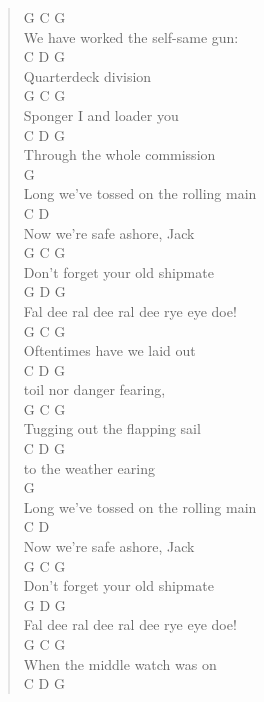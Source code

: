 \documentclass[11pt]{article}
\begin{document}
\begin{verse}
\vspace*{1em}
G                   C        G\\
We have worked the self-same gun:\\
C       D      G\\
Quarterdeck division\\
G              C      G\\
Sponger I and loader you\\
C            D        G\\
Through the whole commission\\
G\\
Long we've tossed on the rolling main\\
C                D\\
Now we're safe ashore, Jack\\
G                  C      G\\
Don't forget your old shipmate\\
G                        D       G\\
Fal dee ral dee ral dee rye eye doe!\\
\vspace*{1em}
\vspace*{1em}
G                C      G\\
Oftentimes have we laid out\\
C         D      G\\
toil nor danger fearing,\\
G                 C       G\\
Tugging out the flapping sail\\
C        D      G\\
to the weather earing\\
G\\
Long we've tossed on the rolling main\\
C                D\\
Now we're safe ashore, Jack\\
G                  C      G\\
Don't forget your old shipmate\\
G                        D       G\\
Fal dee ral dee ral dee rye eye doe!\\
\vspace*{1em}
\vspace*{1em}
G                 C      G\\
When the middle watch was on\\
C        D         G\\

\end{verse}
\end{document}

